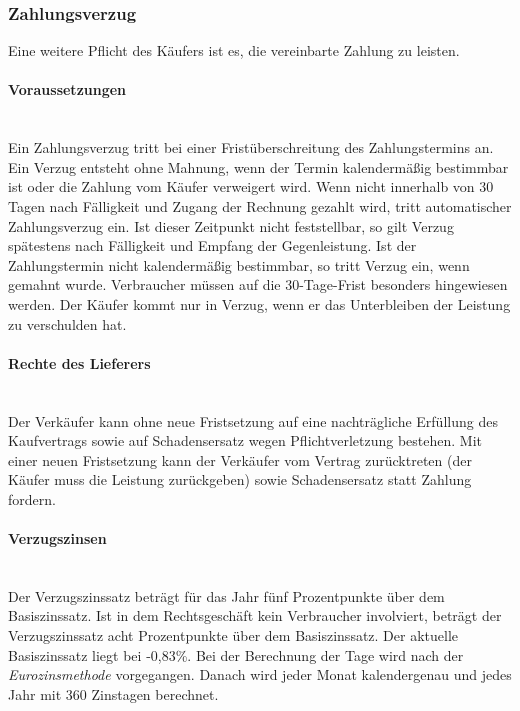 \subsubsection{Zahlungsverzug}
Eine weitere Pflicht des Käufers ist es, die vereinbarte Zahlung zu leisten.

\paragraph{Voraussetzungen}~\\
Ein Zahlungsverzug tritt bei einer Fristüberschreitung des Zahlungstermins an. Ein Verzug entsteht ohne Mahnung, wenn der Termin kalendermäßig bestimmbar ist oder die Zahlung vom Käufer verweigert wird. Wenn nicht innerhalb von 30 Tagen nach Fälligkeit und Zugang der Rechnung gezahlt wird, tritt automatischer Zahlungsverzug ein. Ist dieser Zeitpunkt nicht feststellbar, so gilt Verzug spätestens nach Fälligkeit und Empfang der Gegenleistung. Ist der Zahlungstermin nicht kalendermäßig bestimmbar, so tritt Verzug ein, wenn gemahnt wurde. Verbraucher müssen auf die 30-Tage-Frist besonders hingewiesen werden. Der Käufer kommt nur in Verzug, wenn er das Unterbleiben der Leistung zu verschulden hat.
	
\paragraph{Rechte des Lieferers}~\\
Der Verkäufer kann ohne neue Fristsetzung auf eine nachträgliche Erfüllung des Kaufvertrags sowie auf Schadensersatz wegen Pflichtverletzung bestehen. Mit einer neuen Fristsetzung kann der Verkäufer vom Vertrag zurücktreten (der Käufer muss die Leistung zurückgeben) sowie Schadensersatz statt Zahlung fordern.
	
\paragraph{Verzugszinsen} ~\\
Der Verzugszinssatz beträgt für das Jahr fünf Prozentpunkte über dem Basiszinssatz. Ist in dem Rechtsgeschäft kein Verbraucher involviert, beträgt der Verzugszinssatz acht Prozentpunkte über dem Basiszinssatz. Der aktuelle Basiszinssatz liegt bei -0,83\%. Bei der Berechnung der Tage wird nach der {\it Eurozinsmethode} vorgegangen. Danach wird jeder Monat kalendergenau und jedes Jahr mit 360 Zinstagen berechnet.

